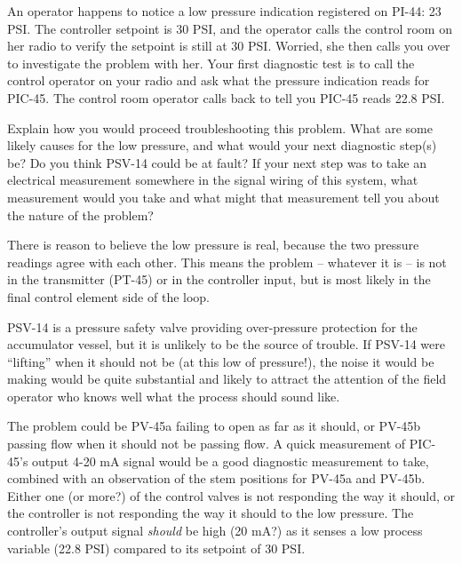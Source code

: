 An operator happens to notice a low pressure indication registered on PI-44: 23 PSI.  The controller setpoint is 30 PSI, and the operator calls the control room on her radio to verify the setpoint is still at 30 PSI.  Worried, she then calls you over to investigate the problem with her.  Your first diagnostic test is to call the control operator on your radio and ask what the pressure indication reads for PIC-45.  The control room operator calls back to tell you PIC-45 reads 22.8 PSI.

\vskip 10pt

Explain how you would proceed troubleshooting this problem.  What are some likely causes for the low pressure, and what would your next diagnostic step(s) be?  Do you think PSV-14 could be at fault?  If your next step was to take an electrical measurement somewhere in the signal wiring of this system, what measurement would you take and what might that measurement tell you about the nature of the problem?







There is reason to believe the low pressure is real, because the two pressure readings agree with each other.  This means the problem -- whatever it is -- is not in the transmitter (PT-45) or in the controller input, but is most likely in the final control element side of the loop.

PSV-14 is a pressure safety valve providing over-pressure protection for the accumulator vessel, but it is unlikely to be the source of trouble.  If PSV-14 were ``lifting'' when it should not be (at this low of pressure!), the noise it would be making would be quite substantial and likely to attract the attention of the field operator who knows well what the process should sound like.







The problem could be PV-45a failing to open as far as it should, or PV-45b passing flow when it should not be passing flow.  A quick measurement of PIC-45's output 4-20 mA signal would be a good diagnostic measurement to take, combined with an observation of the stem positions for PV-45a and PV-45b.  Either one (or more?) of the control valves is not responding the way it should, or the controller is not responding the way it should to the low pressure.  The controller's output signal {\it should} be high (20 mA?) as it senses a low process variable (22.8 PSI) compared to its setpoint of 30 PSI.








